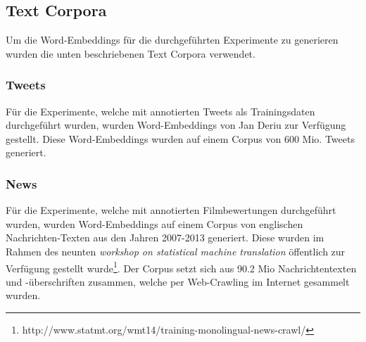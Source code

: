 \subsection{Text Corpora}
Um die Word-Embeddings für die durchgeführten Experimente zu generieren wurden die unten beschriebenen Text Corpora verwendet.

\subsubsection{Tweets}
Für die Experimente, welche mit annotierten Tweets als Trainingsdaten durchgeführt wurden, wurden Word-Embeddings von Jan Deriu zur Verfügung gestellt. Diese Word-Embeddings wurden auf einem Corpus von 600 Mio. Tweets generiert.

\subsubsection{News}
Für die Experimente, welche mit annotierten Filmbewertungen durchgeführt wurden, wurden Word-Embeddings auf einem Corpus von englischen Nachrichten-Texten aus den Jahren 2007-2013 generiert. Diese wurden im Rahmen des neunten \emph{workshop on statistical machine translation} öffentlich zur Verfügung gestellt wurde\footnote{http://www.statmt.org/wmt14/training-monolingual-news-crawl/}. Der Corpus setzt sich aus 90.2 Mio Nachrichtentexten und -überschriften zusammen, welche per Web-Crawling im Internet gesammelt wurden. 